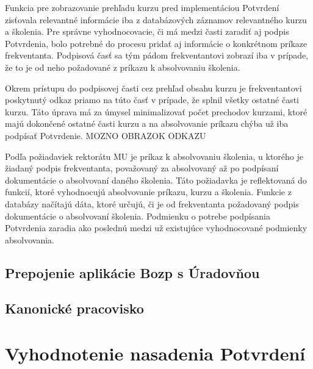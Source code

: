 \documentclass[
  digital,     %
  oneside,     %
  nosansbold,  %
  nocolorbold, %
  lof,         %
  nolot,         %
]{fithesis4}
\begin{document}
Funkcia pre zobrazovanie prehľadu kurzu pred implementáciou Potvrdení zisťovala relevantné informácie iba z databázových záznamov relevantného kurzu a školenia. Pre správne vyhodnocovacie, či má medzi časti zaradiť aj podpis Potvrdenia, bolo potrebné do procesu pridať aj informácie o konkrétnom príkaze frekventanta. Podpisová časť sa tým pádom frekventantovi zobrazí iba v prípade, že to je od neho požadované z príkazu k absolvovaniu školenia.

Okrem prístupu do podpisovej časti cez prehľad obsahu kurzu je frekventantovi poskytnutý odkaz priamo na túto časť v prípade, že splnil všetky ostatné časti kurzu. Táto úprava má za úmysel minimalizovať počet prechodov kurzami, ktoré majú dokončené ostatné časti kurzu a na absolvovanie príkazu chýba už iba podpísať Potvrdenie.
MOZNO OBRAZOK ODKAZU

Podľa požiadaviek rektorátu MU je príkaz k absolvovaniu školenia, u ktorého je žiadaný podpis frekventanta, považovaný za absolvovaný až po podpísaní dokumentácie o absolvovaní daného školenia. Táto požiadavka je reflektovaná do funkcií, ktoré vyhodnocujú absolvovanie príkazu, kurzu a školenia. Funkcie z databázy načítajú dáta, ktoré určujú, či je od frekventanta požadovaný podpis dokumentácie o absolvovaní školenia. Podmienku o potrebe podpísania Potvrdenia zaradia ako poslednú medzi už existujúce vyhodnocované podmienky absolvovania.


 


\section{Prepojenie aplikácie Bozp s Úradovňou}
\section{Kanonické pracovisko}

\chapter{Vyhodnotenie nasadenia Potvrdení}

\printbibliography[heading=bibintoc] %
\end{document}
